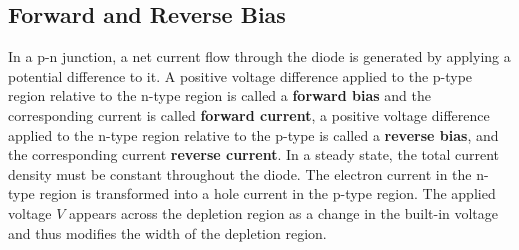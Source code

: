 \documentclass[main]{subfiles}
\begin{document}
\subsection{Forward and Reverse Bias}

In a p-n junction, a net current flow through the diode is generated by applying a potential difference to it. A positive voltage difference applied to the p-type region relative to the n-type region is called a \textbf{forward bias} and the corresponding current is called \textbf{forward current}, a positive voltage difference applied to the n-type region relative to the p-type is called a \textbf{reverse bias}, and the corresponding current \textbf{reverse current}. In a steady state, the total current density must be constant throughout the diode. The electron current in the n-type region is transformed into a hole current in the p-type region. The applied voltage \(V\) appears across the depletion region as a change in the built-in voltage and thus modifies the width of the depletion region.
\end{document}
